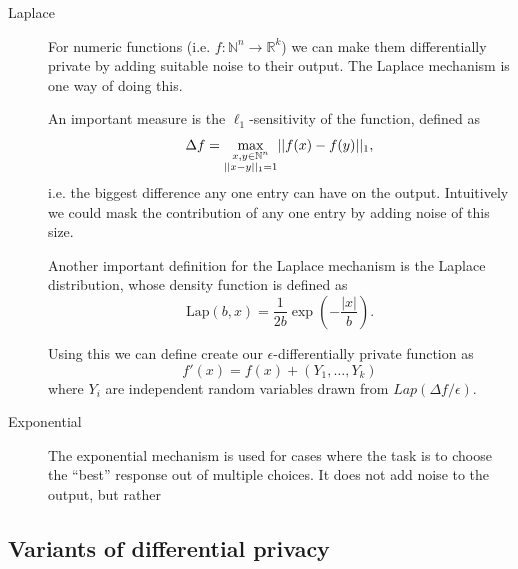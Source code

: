 \documentclass[12pt]{article}
\begin{document}
\begin{description}
    \item[Laplace] For numeric functions (i.e. $f : \mathbb{N}^n \to \mathbb{R}^k$) we can make them differentially private by adding suitable noise to their output. The Laplace mechanism is one way of doing this.
    
    An important measure is the $\ell_1$-sensitivity of the function, defined as
    \begin{equation}
        \Delta f = \underset{\begin{subarray}{c}
            x,y \in \mathbb{N}^{n} \\
            ||x-y||_1 = 1
        \end{subarray}}{\max} || f(x)-f(y) ||_1,
    \end{equation}
    i.e. the biggest difference any one entry can have on the output. Intuitively we could mask the contribution of any one entry by adding noise of this size.
    
    Another important definition for the Laplace mechanism is the Laplace distribution, whose density function is defined as
    \begin{equation}
        \text{Lap}(b,x) = \frac{1}{2b} \exp \left( -\frac{|x|}{b} \right).
    \end{equation}
    
    Using this we can define create our $\epsilon$-differentially private function as
    \begin{equation*}
        f'(x) = f(x) + (Y_1, \dots, Y_k)
    \end{equation*}
    where $Y_i$ are independent random variables drawn from $Lap(\Delta f/\epsilon)$.
    
    \item[Exponential] The exponential mechanism is used for cases where the task is to choose the ``best'' response out of multiple choices. It does not add noise to the output, but rather 
\end{description}

\subsection{Variants of differential privacy}
\end{document}
